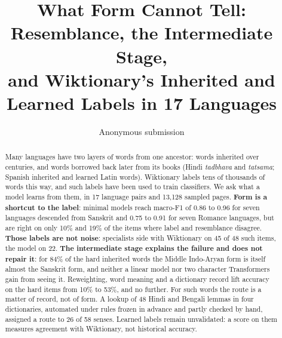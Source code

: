 \documentclass[11pt]{article}
\title{What Form Cannot Tell: Resemblance, the Intermediate Stage,\\and Wiktionary's Inherited and Learned Labels in 17 Languages}
\author{Anonymous submission}
\begin{document}
\maketitle

\begin{abstract}
Many languages have two layers of words from one ancestor: words inherited over centuries, and words borrowed back later from its books (Hindi \textit{tadbhava} and \textit{tatsama}; Spanish inherited and learned Latin words). Wiktionary labels tens of thousands of words this way, and such labels have been used to train classifiers. We ask what a model learns from them, in 17 language pairs and 13,128 sampled pages. \textbf{Form is a shortcut to the label}: minimal models reach macro-F1 of 0.86 to 0.96 for seven languages descended from Sanskrit and 0.75 to 0.91 for seven Romance languages, but are right on only 10\% and 19\% of the items where label and resemblance disagree. \textbf{Those labels are not noise}: specialists side with Wiktionary on 45 of 48 such items, the model on 22. \textbf{The intermediate stage explains the failure and does not repair it}: for 84\% of the hard inherited words the Middle Indo-Aryan form is itself almost the Sanskrit form, and neither a linear model nor two character Transformers gain from seeing it. Reweighting, word meaning and a dictionary record lift accuracy on the hard items from 10\% to 53\%, and no further. For such words the route is a matter of record, not of form. A lookup of 48 Hindi and Bengali lemmas in four dictionaries, automated under rules frozen in advance and partly checked by hand, assigned a route to 26 of 58 senses. Learned labels remain unvalidated: a score on them measures agreement with Wiktionary, not historical accuracy.
\end{abstract}
\end{document}
